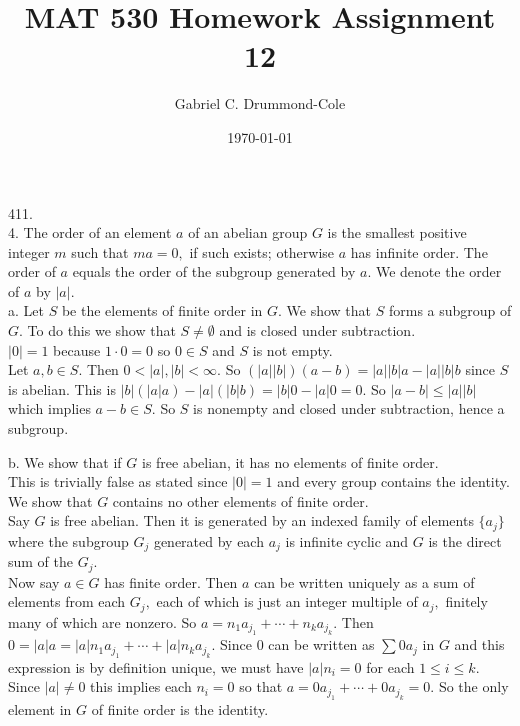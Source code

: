 \documentclass{article}
\title{MAT 530 Homework Assignment 12}
\author{Gabriel C. Drummond-Cole}
\date{\today}
\begin{document}
\maketitle

411.
\\4. The order of an element $a$ of an abelian group $G$ is the smallest positive integer $m$ such that $ma=0,$ if such exists; otherwise $a$ has infinite order.  The order of $a$ equals the order of the subgroup generated by $a.$  We denote the order of $a$ by $|a|.$
\\a. Let $S$ be the elements of finite order in $G.$  We show that $S$ forms a subgroup of $G.$  To do this we show that $S\ne\emptyset$ and is closed under subtraction.
\\$|0|=1$ because $1\cdot0=0$ so $0\in S$ and $S$ is not empty.
\\Let $a,b\in S.$  Then $0<|a|,|b|<\infty.$  So $(|a||b|)(a-b)=|a||b|a-|a||b|b$ since $S$ is abelian.  This is $|b|(|a|a)-|a|(|b|b)=|b|0-|a|0=0.$  So $|a-b|\le |a||b|$ which implies $a-b\in S.$  So $S$ is nonempty and closed under subtraction, hence a subgroup.

b. We show that if $G$ is free abelian, it has no elements of finite order.
\\ This is trivially false as stated since $|0|=1$ and every group contains the identity.  We show that $G$ contains no other elements of finite order.
\\
Say $G$ is free abelian.  Then it is generated by an indexed family of elements $\{a_j\}$ where the subgroup $G_j$ generated by each $a_j$ is infinite cyclic and $G$ is the direct sum of the $G_j.$
\\
Now say $a\in G$ has finite order.  Then $a$ can be written uniquely as a sum of elements from each $G_j,$ each of which is just an integer multiple of $a_j,$ finitely many of which are nonzero.  So $a=n_1a_{j_1}+\cdots+n_ka_{j_k}.$  Then $0=|a|a=|a|n_1a_{j_1}+\cdots+|a|n_ka_{j_k}.$  Since 0 can be written as $\sum 0a_j$ in $G$ and this expression is by definition unique, we must have $|a|n_i=0$ for each $1\le i\le k.$  Since $|a|\ne 0$ this implies each $n_i=0$ so that $a=0a_{j_1}+\cdots+0a_{j_k}=0.$  So the only element in $G$ of finite order is the identity.
\end{document}
